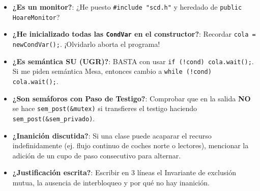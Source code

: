 \documentclass[11pt,a4paper]{article}
\begin{document}
\vspace{0.05cm}

\begin{tcolorbox}[colback=scdLightGreen,colframe=scdGreen,title=\textbf{Checklist de Seguridad antes de Entregar el Examen de Capel},arc=3pt]
\small
\begin{itemize}[leftmargin=*,itemsep=1.5pt]
    \item[$\square$] \textbf{¿Es un monitor?}: ¿He puesto \texttt{\#include "scd.h"} y heredado de \texttt{public HoareMonitor}?
    \item[$\square$] \textbf{¿He inicializado todas las \texttt{CondVar} en el constructor?}: Recordar \texttt{cola = newCondVar();}. ¡Olvidarlo aborta el programa!
    \item[$\square$] \textbf{¿Es semántica SU (UGR)?}: BASTA con usar \texttt{if (!cond) cola.wait();}. Si me piden semántica Mesa, entonces cambio a \texttt{while (!cond) cola.wait();}.
    \item[$\square$] \textbf{¿Son semáforos con Paso de Testigo?}: Comprobar que en la salida \textbf{NO} se hace \texttt{sem\_post(\&mutex)} si transfieres el testigo haciendo \texttt{sem\_post(\&sem\_privado)}.
    \item[$\square$] \textbf{¿Inanición discutida?}: Si una clase puede acaparar el recurso indefinidamente (ej. flujo continuo de coches norte o lectores), mencionar la adición de un cupo de paso consecutivo para alternar.
    \item[$\square$] \textbf{¿Justificación escrita?}: Escribir en 3 líneas el Invariante de exclusión mutua, la ausencia de interbloqueo y por qué no hay inanición.
\end{itemize}
\end{tcolorbox}
\end{document}
